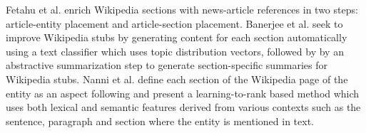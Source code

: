 \documentclass[sigconf,authordraft]{acmart}
\begin{document}


Fetahu et al. \cite{fetahu2015automated} enrich Wikipedia sections with news-article references in two steps: article-entity placement and article-section placement.
Banerjee et al. \cite{banerjee2015wikikreator} seek to improve Wikipedia stubs by generating content for each section automatically using a text classifier which uses topic distribution vectors, followed by by an abstractive summarization step to generate section-specific summaries for Wikipedia stubs.
Nanni et al. \cite{nanni2018entity} define each section of the Wikipedia page of the entity as an aspect following \cite{fetahu2015automated,banerjee2015wikikreator} and present a learning-to-rank based method which uses both lexical and semantic features derived from various contexts such as the sentence, paragraph and section where the entity is mentioned in text. 

\end{document}
